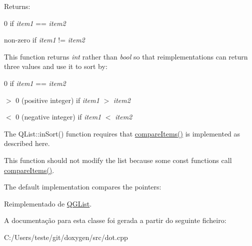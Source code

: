 Returns\-: 
\begin{DoxyItemize}
\item 0 if {\itshape item1} == {\itshape item2} 
\item non-\/zero if {\itshape item1} != {\itshape item2} 
\end{DoxyItemize}

This function returns {\itshape int} rather than {\itshape bool} so that reimplementations can return three values and use it to sort by\-:


\begin{DoxyItemize}
\item 0 if {\itshape item1} == {\itshape item2} 
\item $>$ 0 (positive integer) if {\itshape item1} $>$ {\itshape item2} 
\item $<$ 0 (negative integer) if {\itshape item1} $<$ {\itshape item2} 
\end{DoxyItemize}

The Q\-List\-::in\-Sort() function requires that \hyperlink{class_dot_node_list_a219450accf048597ffc7113ecde4c402}{compare\-Items()} is implemented as described here.

This function should not modify the list because some const functions call \hyperlink{class_dot_node_list_a219450accf048597ffc7113ecde4c402}{compare\-Items()}.

The default implementation compares the pointers\-: 
\begin{DoxyCode}
\end{DoxyCode}
 

Reimplementado de \hyperlink{class_q_g_list_aac689c6d7a54b6558afbd53845183af8}{Q\-G\-List}.



A documentação para esta classe foi gerada a partir do seguinte ficheiro\-:\begin{DoxyCompactItemize}
\item 
C\-:/\-Users/teste/git/doxygen/src/dot.\-cpp\end{DoxyCompactItemize}
